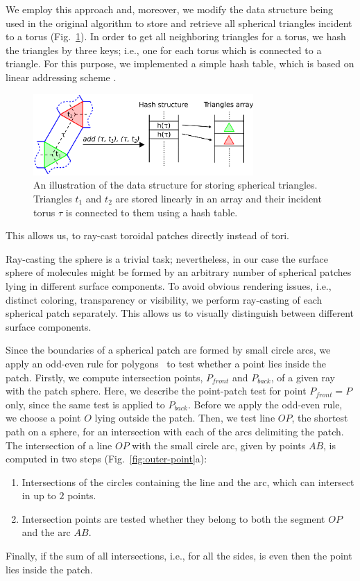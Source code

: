 We employ this approach and, moreover, we modify the data structure being used in the original algorithm to store and retrieve all spherical triangles incident to a torus (Fig.~\ref{fig:hashing}). In order to get all neighboring triangles for a torus, we hash the triangles by three keys; i.e., one for each torus which is connected to a triangle.
For this purpose, we implemented a simple hash table, which is based on linear addressing scheme \cite{alcantara2011efficient}.
\begin{figure}[htb]
  \centering
  \includegraphics[width=3.3in]{image/hashing.png}
  \caption{An illustration of the data structure for storing spherical triangles. Triangles $t_1$ and $t_2$ are stored linearly in an array and their incident torus $\tau$ is connected to them using a hash table.}
	\label{fig:hashing}
\end{figure}
This allows us, to ray-cast toroidal patches directly instead of tori.


Ray-casting the sphere is a trivial task; nevertheless, in our case the surface sphere of molecules might be formed by an arbitrary number of spherical patches lying in different surface components. To avoid obvious rendering issues, i.e., distinct coloring, transparency or visibility, we perform ray-casting of each spherical patch separately.
This allows us to visually distinguish between different surface components.

Since the boundaries of a spherical patch are formed by small circle arcs, we apply an odd-even rule for polygons~\cite{shimrat1962algorithm} to test whether a point lies inside the patch. Firstly, we compute intersection points, $P_{front}$ and $P_{back}$, of a given ray with the patch sphere.
Here, we describe the point-patch test for point $P_{front}=P$ only, since the same test is applied to $P_{back}$.
Before we apply the odd-even rule, we choose a point $O$ lying outside the patch.
Then, we test line $OP$, the shortest path on a sphere, for an intersection with each of the arcs delimiting the patch.
The intersection of a line $OP$ with the small circle arc, given by points $AB$, is computed in two steps (Fig.~\ref{fig:outer-point}a):
\begin{enumerate}
  \item Intersections of the circles containing the line and the arc, which can intersect in up to $2$ points.
  \item Intersection points are tested whether they belong to both the segment $OP$ and the arc $AB$.
\end{enumerate}
Finally, if the sum of all intersections, i.e., for all the sides, is even then the point lies inside the patch.


